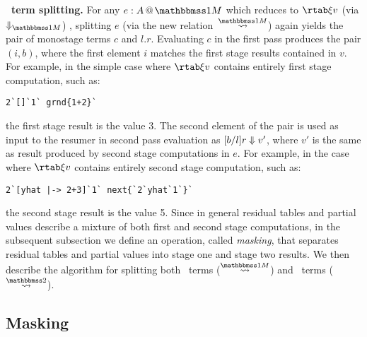 \begin{abstrsyn}
\textbf{\bbonem\ term splitting.}  For any $\colmix e A$ which reduces
to $\rtab \xi v$ (via $\redonesym$) , splitting $e$ (via the new
relation~$\splitonesym$) again yields the pair of monostage terms $c$
and $l.r$. Evaluating $c$ in the first pass produces the pair $(i,b)$,
where the first element $i$ matches the first stage results contained
in $v$.  For example, in the simple case where $\rtab \xi v$ contains
entirely first stage computation, such as:
\begin{lstlisting}
2`[]`1` grnd{1+2}`
\end{lstlisting}
the first stage result is the value 3.  The second element of the pair
is used as input to the resumer in second pass evaluation as ${[b/l]r} \Downarrow {v'}$, where $v'$ is the same as result produced by second
stage computations in $e$.  For example, in the case where $\rtab \xi
v$ contains entirely second stage computation, such as:
\begin{lstlisting}
2`[yhat |-> 2+3]`1` next{`2`yhat`1`}`
\end{lstlisting}
the second stage result is the value 5. Since in general residual
tables and partial values describe a mixture of both first and second
stage computations, in the subsequent subsection we define an
operation, called {\em masking}, that separates residual tables and
partial values into stage one and stage two results. We then describe
the algorithm for splitting both \bbonem\ terms ($\splitonesym$) and
\bbtwo\ terms ($\splittwosym$).



  
\subsection{Masking}
\label{sec:masking}


\end{abstrsyn}
